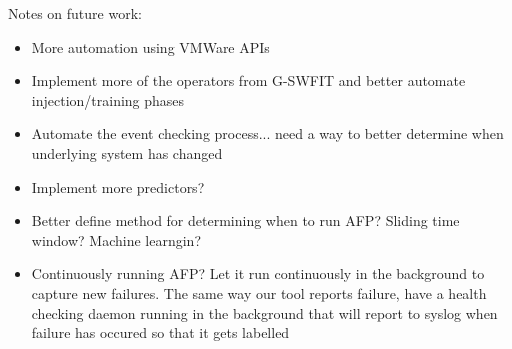 Notes on future work:

\begin{itemize}
\item{More automation using VMWare APIs}
\item{Implement more of the operators from G-SWFIT and better automate
injection/training phases}
\item{Automate the event checking process... need a way to better determine
when underlying system has changed}
\item{Implement more predictors?}
\item{Better define method for determining when to run AFP? Sliding time
window?  Machine learngin?}
\item{Continuously running AFP?  Let it run continuously in the background to
capture new failures.  The same way our tool reports failure, have a health
checking daemon running in the background that will report to syslog when
failure has occured so that it gets labelled}
\end{itemize}
